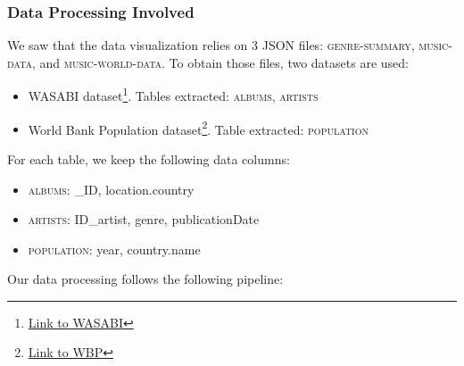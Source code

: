 \documentclass[twocolumn, letterpaper,13pt]{scrartcl}
\begin{document}
    \subsubsection*{Data Processing Involved}
    
    We saw that the data visualization relies on 3 JSON files: \textsc{genre-summary}, \textsc{music-data}, and \textsc{music-world-data}. To obtain those files, two datasets are used:
    
    \begin{itemize}
        \item WASABI dataset\footnote{\href{https://github.com/micbuffa/WasabiDataset}{Link to WASABI}}. Tables extracted: \textsc{albums}, \textsc{artists}
        \item World Bank Population dataset\footnote{\href{https://data.worldbank.org/indicator/SP.POP.TOTL}{Link to WBP}}. Table extracted: \textsc{population}
    \end{itemize}
    For each table, we keep the following data columns:
    
    \begin{itemize}
        \item \textsc{albums}: \_ID, location.country
        \item \textsc{artists}: ID\_artist, genre, publicationDate
        \item \textsc{population}: year, country.name
    \end{itemize}
    Our data processing follows the following pipeline:
    
\end{document}
